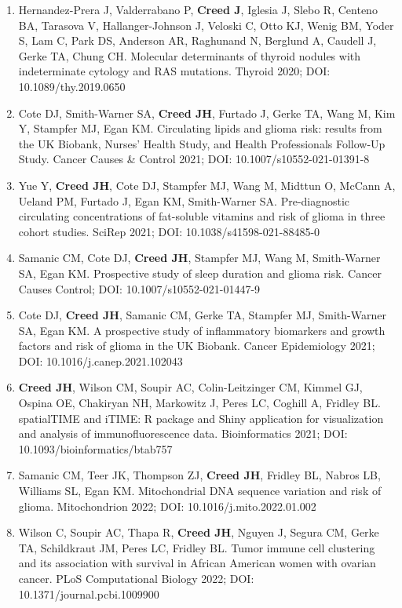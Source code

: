 \documentclass[11pt, a4paper]{article} %
\begin{document}
\begin{enumerate}[leftmargin=*]
\item{} Hernandez-Prera J, Valderrabano P, {\bf Creed J}, Iglesia J, Slebo R, Centeno BA, Tarasova V, Hallanger-Johnson J, Veloski C, Otto KJ, Wenig BM, Yoder S, Lam C, Park DS, Anderson AR, Raghunand N, Berglund A, Caudell J, Gerke TA, Chung CH.  Molecular determinants of thyroid nodules with indeterminate cytology and RAS mutations. Thyroid 2020; DOI: 10.1089/thy.2019.0650

\item{} Cote DJ, Smith-Warner SA, {\bf Creed JH}, Furtado J, Gerke TA, Wang M, Kim Y, Stampfer MJ, Egan KM. Circulating lipids and glioma risk: results from the UK Biobank, Nurses’ Health Study, and Health Professionals Follow-Up Study. Cancer Causes \& Control 2021; DOI: 10.1007/s10552-021-01391-8

\item{} Yue Y, {\bf Creed JH}, Cote DJ, Stampfer MJ, Wang M, Midttun O, McCann A, Ueland PM, Furtado J, Egan KM, Smith-Warner SA. Pre-diagnostic circulating concentrations of fat-soluble vitamins and risk of glioma in three cohort studies. SciRep 2021; DOI: 10.1038/s41598-021-88485-0

\item{} Samanic CM, Cote DJ, {\bf Creed JH}, Stampfer MJ, Wang M, Smith-Warner SA, Egan KM. Prospective study of sleep duration and glioma risk. Cancer Causes Control; DOI: 10.1007/s10552-021-01447-9

\item{} Cote DJ, {\bf Creed JH}, Samanic CM, Gerke TA, Stampfer MJ, Smith-Warner SA, Egan KM. A prospective study of inflammatory biomarkers and growth factors and risk of glioma in the UK Biobank. Cancer Epidemiology 2021; DOI: 10.1016/j.canep.2021.102043

\item{} {\bf Creed JH}, Wilson CM, Soupir AC, Colin-Leitzinger CM, Kimmel GJ, Ospina OE, Chakiryan NH, Markowitz J, Peres LC, Coghill A, Fridley BL. spatialTIME and iTIME: R package and Shiny application for visualization and analysis of immunofluorescence data. Bioinformatics 2021; DOI: 10.1093/bioinformatics/btab757

\item{} Samanic CM, Teer JK, Thompson ZJ, {\bf Creed JH}, Fridley BL, Nabros LB, Williams SL, Egan KM. Mitochondrial DNA sequence variation and risk of glioma. Mitochondrion 2022; DOI: 10.1016/j.mito.2022.01.002

\item{} Wilson C, Soupir AC, Thapa R, {\bf Creed JH}, Nguyen J, Segura CM, Gerke TA, Schildkraut JM, Peres LC, Fridley BL. Tumor immune cell clustering and its association with survival in African American women with ovarian cancer. PLoS Computational Biology 2022; DOI: 10.1371/journal.pcbi.1009900


\end{enumerate}
\end{document}
